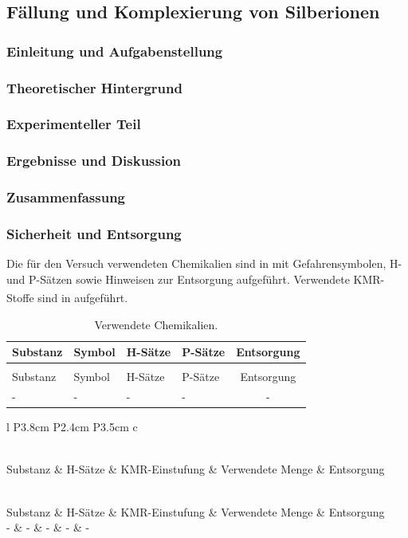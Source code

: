 \documentclass[
	a4paper,										%
	12pt,											%
	twoside,										%
	headsepline,								%
	footsepline,									%
	captions=tableheading,					%
]{scrartcl}
\newcommand{\zitat}[1]{\textsuperscript{\cite{#1}}}
\newcommand{\langetabelle}[6]{  %
	\begin{centering}           %
		{\begin{longtable}[#3]{#4}
				\caption{#2\label{tab: #1}}\\				
				\hline
				#5
				\hline
				\endfirsthead
                \caption{#2\label{tab: #1}}\\
				\hline
				#5
				\hline
				\endhead
				#6												
				\hline 
		\end{longtable}}
\end{centering}}
\begin{document}
\newpage

\setcounter{subsection}{1}							%
\setcounter{secnumdepth}{4}
	
\subsection{Fällung und Komplexierung von Silberionen}

\subsubsection{Einleitung und Aufgabenstellung}

\subsubsection{Theoretischer Hintergrund}

\subsubsection{Experimenteller Teil}

\subsubsection{Ergebnisse und Diskussion}

\subsubsection{Zusammenfassung}

\subsubsection{Sicherheit und Entsorgung}
		
Die für den Versuch verwendeten Chemikalien sind in  mit Gefahrensymbolen, H- und P-Sätzen sowie Hinweisen zur Entsorgung aufgeführt. Verwendete KMR-Stoffe sind in  aufgeführt.\zitat{entsorgung1}
	
\langetabelle
	{entsorgung1}
	{Verwendete Chemikalien.}
	{H}  %
	{l p{1.4cm} p{2.2cm} p{4.5cm} c}
	{Substanz & Symbol & H-Sätze & P-Sätze & Entsorgung \\}
	{ - & - & - & - & - \\}

\langetabelle
	{KMR1}
	{Verwendete kanzerogene, mutagene oder reproduktionstoxische Gefahrstoffe (KMR).}
	{H}
	{l P{3.8cm} P{2.4cm} P{3.5cm} c}
	{Substanz & H-Sätze & KMR-Einstufung & Verwendete Menge & Entsorgung \\}
	{ - & - & - & - & - \\}
	
\end{document}
